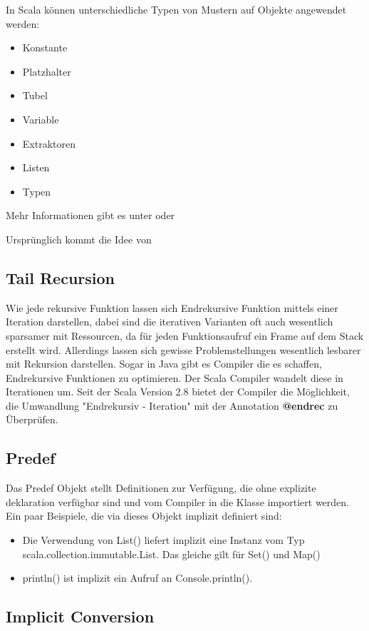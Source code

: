 In Scala k\"onnen unterschiedliche Typen von Mustern auf Objekte angewendet werden:
\begin{itemize}
	\item Konstante
	\item Platzhalter
	\item Tubel
	\item Variable
	\item Extraktoren
	\item Listen
	\item Typen
\end{itemize}

Mehr Informationen gibt es unter \cite[p. 263-296]{odersky2008programming} oder \cite[p. 167-176]{Piepmeyer201006}

Urspr\"unglich kommt die Idee von

\subsection{Tail Recursion}
Wie jede rekursive Funktion lassen sich Endrekursive\cite{wiki:Endrekursion} Funktion mittels einer Iteration darstellen, dabei sind die iterativen Varianten oft auch wesentlich sparsamer mit Ressourcen, da f\"ur jeden Funktionsaufruf ein Frame auf dem Stack erstellt wird. Allerdings lassen sich gewisse Problemstellungen wesentlich lesbarer mit Rekursion darstellen. Sogar in Java gibt es Compiler die es schaffen, Endrekursive Funktionen zu optimieren. Der Scala Compiler wandelt diese in Iterationen um. Seit der Scala Version 2.8 bietet der Compiler die M\"oglichkeit, die  Umwandlung "Endrekursiv - Iteration" mit der Annotation \textbf{@endrec} zu \"Uberpr\"ufen.

\subsection{Predef}
Das Predef Objekt stellt Definitionen zur Verf\"ugung, die ohne explizite deklaration verf\"ugbar sind und vom Compiler in die Klasse importiert werden. Ein paar Beispiele, die via dieses Objekt implizit definiert sind: 
\begin{itemize}
	\item Die Verwendung von List() liefert implizit eine Instanz vom Typ scala.collection.immutable.List. Das gleiche gilt f\"ur Set() und Map()
	\item println() ist implizit ein Aufruf an Console.println().
\end{itemize}

\subsection{Implicit Conversion}

